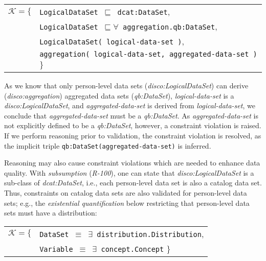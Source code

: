 \documentclass{llncs}
\newcommand{\ms}[1]{\texttt{#1}}
\newenvironment{DL}{
  \vspace{0cm}
	\begin{center}
  \begin{tabular}{c l}

}{
  \end{tabular}
	\end{center}
}
\begin{document}
{\begin{center}
\begin{DL} 
$\mathcal{K}=\{$ &\ms{LogicalDataSet $\sqsubseteq$ dcat:DataSet},\\
 &\ms{LogicalDataSet $\sqsubseteq \forall$ aggregation.qb:DataSet},\\
 &\ms{LogicalDataSet( logical-data-set )},\\
 &\ms{aggregation( logical-data-set, aggregated-data-set )}
 \}\\ 
\end{DL}
\end{center}

As we know that only person-level data sets (\emph{disco:LogicalDataSet}) can derive (\emph{disco:aggregation}) aggregated data sets (\emph{qb:DataSet}), 
{\em logical-data-set} is a \emph{disco:LogicalDataSet}, 
and \emph{aggregated-data-set} is derived from \emph{logical-data-set},
we conclude that \emph{aggregated-data-set} must be a \emph{qb:DataSet}.
As \emph{aggregated-data-set} is not explicitly defined to be a \emph{qb:DataSet}, however, a constraint violation is raised.
If we perform reasoning prior to validation, the constraint violation is resolved, as the implicit triple \ms{qb:DataSet(aggregated-data-set)} is inferred. 

Reasoning may also cause constraint violations which are needed to enhance data quality.
With \emph{subsumption} (\emph{R-100}), one can state that \emph{disco:LogicalDataSet} is a sub-class of \emph{dcat:DataSet}, 
i.e., each person-level data set is also a catalog data set.
Thus, constraints on catalog data sets are also validated for person-level data sets;
e.g., the \emph{existential quantification} below restricting that person-level data sets must have a distribution: 

\begin{center}
\begin{DL} 
$\mathcal{K}=\{$ 
 &\ms{DataSet $\equiv$ $\exists$ distribution.Distribution},\\
&\ms{Variable $\equiv$ $\exists$ concept.Concept}
 \}\\ 
\end{DL}
\end{center}

}
\end{document}
